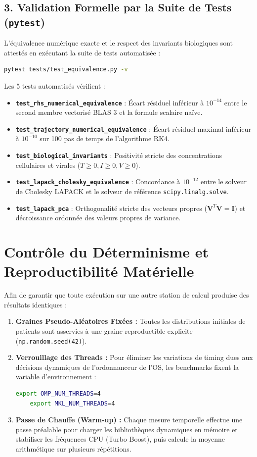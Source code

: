 \documentclass[11pt,a4paper]{report}
\theoremstyle{plain}
\theoremstyle{definition}
\theoremstyle{remark}
\begin{document}
\subsection{3. Validation Formelle par la Suite de Tests (\texttt{pytest})}
L'équivalence numérique exacte et le respect des invariants biologiques sont attestés en exécutant la suite de tests automatisée :
\begin{lstlisting}[language=bash]
pytest tests/test_equivalence.py -v
\end{lstlisting}
Les 5 tests automatisés vérifient :
\begin{itemize}
    \item \textbf{\texttt{test\_rhs\_numerical\_equivalence}} : Écart résiduel inférieur à $10^{-14}$ entre le second membre vectorisé BLAS 3 et la formule scalaire naïve.
    \item \textbf{\texttt{test\_trajectory\_numerical\_equivalence}} : Écart résiduel maximal inférieur à $10^{-10}$ sur 100 pas de temps de l'algorithme RK4.
    \item \textbf{\texttt{test\_biological\_invariants}} : Positivité stricte des concentrations cellulaires et virales ($T \ge 0, I \ge 0, V \ge 0$).
    \item \textbf{\texttt{test\_lapack\_cholesky\_equivalence}} : Concordance à $10^{-12}$ entre le solveur de Cholesky LAPACK et le solveur de référence \texttt{scipy.linalg.solve}.
    \item \textbf{\texttt{test\_lapack\_pca}} : Orthogonalité stricte des vecteurs propres ($\mathbf{V}^T\mathbf{V} = \mathbf{I}$) et décroissance ordonnée des valeurs propres de variance.
\end{itemize}

\section{Contrôle du Déterminisme et Reproductibilité Matérielle}
Afin de garantir que toute exécution sur une autre station de calcul produise des résultats identiques :
\begin{enumerate}
    \item \textbf{Graines Pseudo-Aléatoires Fixées :} Toutes les distributions initiales de patients sont asservies à une graine reproductible explicite (\texttt{np.random.seed(42)}).
    \item \textbf{Verrouillage des Threads :} Pour éliminer les variations de timing dues aux décisions dynamiques de l'ordonnanceur de l'OS, les benchmarks fixent la variable d'environnement :
    \begin{lstlisting}[language=bash]
    export OMP_NUM_THREADS=4
    export MKL_NUM_THREADS=4
    \end{lstlisting}
    \item \textbf{Passe de Chauffe (Warm-up) :} Chaque mesure temporelle effectue une passe préalable pour charger les bibliothèques dynamiques en mémoire et stabiliser les fréquences CPU (Turbo Boost), puis calcule la moyenne arithmétique sur plusieurs répétitions.
\end{enumerate}
\end{document}
